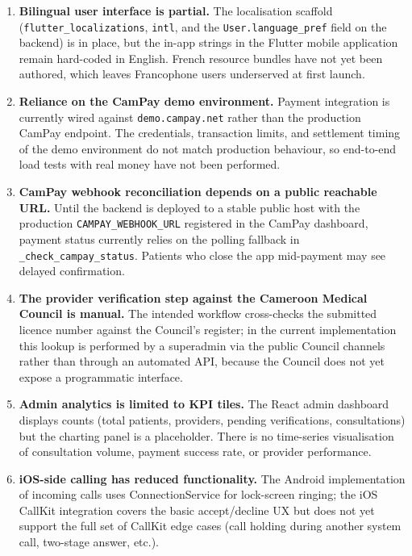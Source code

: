 \begin{enumerate}
  \item \textbf{Bilingual user interface is partial.} The localisation scaffold (\texttt{flutter\_localizations}, \texttt{intl}, and the \texttt{User.language\_pref} field on the backend) is in place, but the in-app strings in the Flutter mobile application remain hard-coded in English. French resource bundles have not yet been authored, which leaves Francophone users underserved at first launch.

  \item \textbf{Reliance on the CamPay demo environment.} Payment integration is currently wired against \texttt{demo.campay.net} rather than the production CamPay endpoint. The credentials, transaction limits, and settlement timing of the demo environment do not match production behaviour, so end-to-end load tests with real money have not been performed.

  \item \textbf{CamPay webhook reconciliation depends on a public reachable URL.} Until the backend is deployed to a stable public host with the production \texttt{CAMPAY\_WEBHOOK\_URL} registered in the CamPay dashboard, payment status currently relies on the polling fallback in \texttt{\_check\_campay\_status}. Patients who close the app mid-payment may see delayed confirmation.

  \item \textbf{The provider verification step against the Cameroon Medical Council is manual.} The intended workflow cross-checks the submitted licence number against the Council's register; in the current implementation this lookup is performed by a superadmin via the public Council channels rather than through an automated API, because the Council does not yet expose a programmatic interface.

  \item \textbf{Admin analytics is limited to KPI tiles.} The React admin dashboard displays counts (total patients, providers, pending verifications, consultations) but the charting panel is a placeholder. There is no time-series visualisation of consultation volume, payment success rate, or provider performance.

  \item \textbf{iOS-side calling has reduced functionality.} The Android implementation of incoming calls uses ConnectionService for lock-screen ringing; the iOS CallKit integration covers the basic accept/decline UX but does not yet support the full set of CallKit edge cases (call holding during another system call, two-stage answer, etc.).


\end{enumerate}
